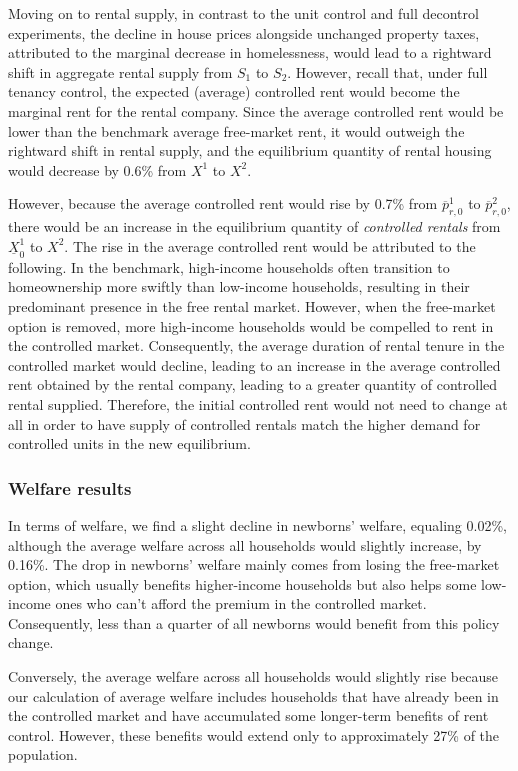 \documentclass[parskip=full]{article}
\begin{document}
Moving on to rental supply, in contrast to the unit control and full decontrol experiments, the decline in house prices alongside unchanged property taxes, attributed to the marginal decrease in homelessness, would lead to a rightward shift in aggregate rental supply from $S_{1}$ to $S_{2}$. However, recall that, under full tenancy control, the expected (average) controlled rent would become the marginal rent for the rental company. Since the average controlled rent would be lower than the benchmark average free-market rent, it would outweigh the rightward shift in rental supply, and the equilibrium quantity of rental housing would decrease by 0.6\% from $X^{1}$ to $X^{2}$.

However, because the average controlled rent would rise by 0.7\% from $\overline{p}^{1}_{r,0}$ to $\overline{p}^{2}_{r,0}$, there would be an increase in the equilibrium quantity of \textsl{controlled rentals} from $\underline{X}^{1}_{0}$ to $X^{2}$. The rise in the average controlled rent would be attributed to the following. In the benchmark, high-income households often transition to homeownership more swiftly than low-income households, resulting in their predominant presence in the free rental market. However, when the free-market option is removed, more high-income households would be compelled to rent in the controlled market. Consequently, the average duration of rental tenure in the controlled market would decline, leading to an increase in the average controlled rent obtained by the rental company, leading to a greater quantity of controlled rental supplied. Therefore, the initial controlled rent would not need to change at all in order to have supply of controlled rentals match the higher demand for controlled units in the new equilibrium. 

\subsubsection{Welfare results}

In terms of welfare, we find a slight decline in newborns' welfare, equaling 0.02\%, although the average welfare across all households would slightly increase, by 0.16\%. The drop in newborns' welfare mainly comes from losing the free-market option, which usually benefits higher-income households but also helps some low-income ones who can't afford the premium in the controlled market. Consequently, less than a quarter of all newborns would benefit from this policy change.

Conversely, the average welfare across all households would slightly rise because our calculation of average welfare includes households that have already been in the controlled market and have accumulated some longer-term benefits of rent control. However, these benefits would extend only to approximately 27\% of the population.
\end{document}
